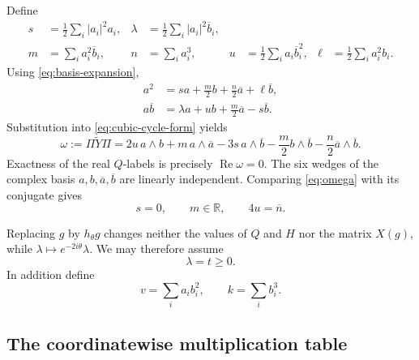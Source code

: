 \documentclass[11pt,reqno]{amsart}
\theoremstyle{remark}
\newcommand{\R}{\mathbb R}
\newcommand{\abs}[1]{\left\lvert #1\right\rvert}
\begin{document}
Define
\begin{align}
s&=\frac12\sum_i\abs{a_i}^2a_i,
&\lambda&=\frac12\sum_i\abs{a_i}^2\overline b_i,\label{eq:s-lambda}\\
m&=\sum_i a_i^2\overline b_i,
&n&=\sum_i a_i^3,
&u&=\frac12\sum_i a_i\overline b_i^2,
&\ell&=\frac12\sum_i a_i^2b_i.\label{eq:m-n-u-ell}
\end{align}
Using \eqref{eq:basis-expansion},
\begin{align}
a^2&=sa+\frac m2b+\frac n2\overline a+\ell\overline b,
\label{eq:a2-expansion}\\
a\overline b&=\lambda a+ub+\frac m2\overline a-s\overline b.
\label{eq:abbar-expansion}
\end{align}
Substitution into \eqref{eq:cubic-cycle-form} yields
\begin{equation}\label{eq:omega}
\omega:=\Pi\widetilde Y\Pi
=2u\,a\wedge b
+m\,a\wedge\overline a
-3s\,a\wedge\overline b
-\frac m2b\wedge\overline b
-\frac n2\overline a\wedge\overline b.
\end{equation}
Exactness of the real $Q$-labels is precisely $\operatorname{Re}\omega=0$.
The six wedges of the complex basis $a,b,\overline a,\overline b$ are linearly
independent.  Comparing \eqref{eq:omega} with its conjugate gives
\begin{equation}\label{eq:cubic-exactness-conditions}
s=0,
\qquad m\in\R,
\qquad 4u=\overline n.
\end{equation}

Replacing $g$ by $h_\theta g$ changes neither the values of $Q$ and $H$ nor
the matrix $X(g)$, while
$\lambda\mapsto e^{-2i\theta}\lambda$.  We may therefore assume
\begin{equation}\label{eq:t-gauge}
\lambda=t\ge0.
\end{equation}
In addition define
\begin{equation}\label{eq:v-k}
v=\sum_i a_ib_i^2,
\qquad
k=\sum_i b_i^3.
\end{equation}

\subsection{The coordinatewise multiplication table}
\end{document}
